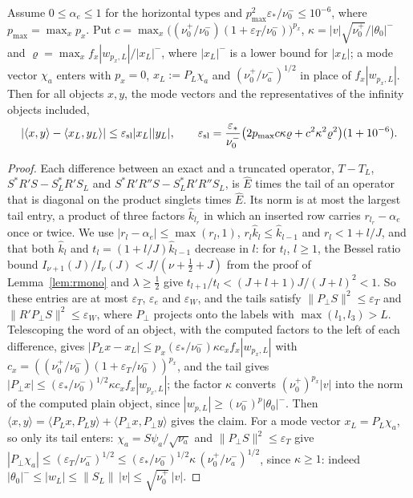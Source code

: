 \begin{lemma}\label{lem:rhslack}
Assume $0\le\alpha_e\le1$ for the horizontal types and $p_{\max}^2\varepsilon_*/\nu_0^-\le10^{-6}$, where $p_{\max}=\max_xp_x$. Put
$c=\max_x\big((\nu_0^+/\nu_0^-)(1+\varepsilon_T/\nu_0^-)\big)^{p_x}$, $\kappa=|v|\sqrt{\nu_0^+}/|\theta_0|^-$ and $\varrho=\max_xf_x|w_{p_x,L}|/|x_L|^-$, where
$|x_L|^-$ is a lower bound for $|x_L|$; a mode vector $\chi_a$ enters with $p_x=0$, $x_L:=P_L\chi_a$ and $(\nu_0^+/\nu_a^-)^{1/2}$ in place of
$f_x|w_{p_x,L}|$. Then for all objects $x,y$, the
mode vectors and the representatives of the infinity objects included,
\[
|\langle x,y\rangle-\langle x_L,y_L\rangle|\le\varepsilon_{\rm sl}|x_L||y_L|,\qquad
\varepsilon_{\rm sl}=\frac{\varepsilon_*}{\nu_0^-}\big(2p_{\max}c\kappa\varrho+c^2\kappa^2\varrho^2\big)(1+10^{-6}).
\]
\end{lemma}

\begin{proof}
Each difference between an exact and a truncated operator, $T-T_L$, $S^*R'S-S_L^*R'S_L$ and $S^*R'R''S-S_L^*R'R''S_L$, is $\hat E$ times the tail of an
operator that is diagonal on the product singlets times $\hat E$. Its norm is at most the largest tail entry, a product of three factors $\hat k_{l_r}$ in
which an inserted row carries $r_{l_r}-\alpha_e$ once or twice. We use $|r_l-\alpha_e|\le\max(r_l,1)$, $r_l\hat k_l\le\hat k_{l-1}$ and $r_l<1+l/J$, and that
both $\hat k_l$ and $t_l=(1+l/J)\hat k_{l-1}$ decrease in $l$: for $t_l$, $l\ge1$, the Bessel ratio bound $I_{\nu+1}(J)/I_\nu(J)<J/(\nu+\frac12+J)$ from the
proof of Lemma~\ref{lem:rmono} and $\lambda\ge\frac12$ give $t_{l+1}/t_l<(J+l+1)J/(J+l)^2<1$. So these entries are at most $\varepsilon_T$,
$\varepsilon_e$ and $\varepsilon_W$, and the tails satisfy
$\|P_\perp S\|^2\le\varepsilon_T$ and $\|R'P_\perp S\|^2\le\varepsilon_W$, where $P_\perp$ projects onto the labels with $\max(l_1,l_3)>L$. Telescoping the
word of an object, with the computed factors to the left of each difference, gives $|P_Lx-x_L|\le p_x(\varepsilon_*/\nu_0^-)\kappa c_xf_x|w_{p_x,L}|$
with $c_x=((\nu_0^+/\nu_0^-)(1+\varepsilon_T/\nu_0^-))^{p_x}$, and the tail gives $|P_\perp x|\le(\varepsilon_*/\nu_0^-)^{1/2}\kappa c_xf_x|w_{p_x,L}|$; the factor
$\kappa$ converts $(\nu_0^+)^{p_x}|v|$ into the norm of the computed plain object, since $|w_{p,L}|\ge(\nu_0^-)^p|\theta_0|^-$. Then
$\langle x,y\rangle=\langle P_Lx,P_Ly\rangle+\langle P_\perp x,P_\perp y\rangle$ gives the claim. For a mode vector $x_L=P_L\chi_a$, so only its tail enters:
$\chi_a=S\psi_a/\sqrt{\nu_a}$ and $\|P_\perp S\|^2\le\varepsilon_T$ give $|P_\perp\chi_a|\le(\varepsilon_T/\nu_a^-)^{1/2}\le(\varepsilon_*/\nu_0^-)^{1/2}\kappa\,
(\nu_0^+/\nu_a^-)^{1/2}$, since $\kappa\ge1$: indeed $|\theta_0|^-\le|w_L|\le\|S_L\|\,|v|\le\sqrt{\nu_0^+}\,|v|$.
\end{proof}

